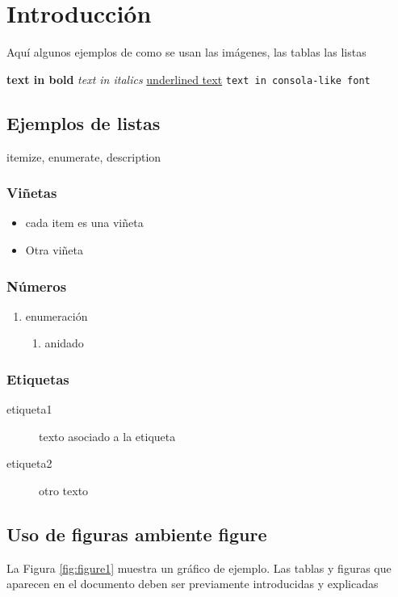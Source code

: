 \section{Introducción}

Aquí algunos ejemplos de como se usan las imágenes, las tablas las listas

\textbf{ text in bold}
\textit{text in italics}
\underline{underlined text}
\texttt{text in consola-like font}

\subsection{Ejemplos de listas}
itemize, enumerate, description

\subsubsection{Viñetas}
\begin{itemize}
    \item cada item es una viñeta
    \item Otra viñeta
\end{itemize}

\subsubsection{Números}
\begin{enumerate}
    \item enumeración
    \begin{enumerate}
        \item anidado
    \end{enumerate}
\end{enumerate}

\subsubsection{Etiquetas}
\begin{description}
    \item[etiqueta1] texto asociado a la etiqueta
    \item[etiqueta2] otro texto
\end{description}



\subsection*{Uso de figuras ambiente figure}
La Figura \ref{fig:figure1} muestra un gráfico de ejemplo. Las tablas y figuras que aparecen en el documento deben ser previamente introducidas y explicadas


